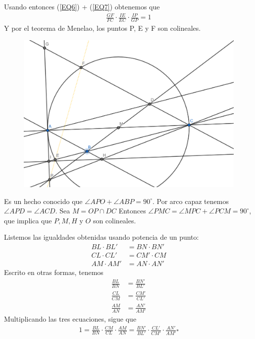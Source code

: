 \begin{sol}
	Usando entonces (\ref{EQ6}) + (\ref{EQ7}) obtenemos que
	\begin{align}
	\frac{GF}{FC} \cdot \frac{IE}{EC} \cdot \frac{IP}{GP} = 1 
	\end{align}
	Y por el teorema de Menelao, los puntos P, E y F son colineales.
	\begin{figure}[h!] 
		\centering
		\includegraphics[scale=0.4]{Imgs/JT2.png}
	\end{figure}
\end{sol}

\begin{sol}
	Es un hecho conocido que $\angle{APO} + \angle{ABP} = 90^{\circ}$. Por arco capaz tenemos $\angle{APD} = \angle{ACD}$. Sea $M = OP \cap DC$ Entonces $\angle{PMC} = \angle{MPC} + \angle{PCM} = 90^{\circ}$, que implica que $P, M, H$ y $O$ son colineales. 
\end{sol}

\begin{sol}
	Listemos las igualdades obtenidas usando potencia de un punto:
	\begin{align}
	BL \cdot BL' &= BN \cdot BN' \\
	CL \cdot CL' &= CM' \cdot CM \\
	AM \cdot AM' & = AN \cdot AN' 
	\end{align}
	Escrito en otras formas, tenemos 
	\begin{align}
	\frac{BL}{BN}&= \frac{BN'}{BL'} \\
	\frac{CL}{CM}&= \frac{CM'}{CL'} \\
	\frac{AM}{AN}&= \frac{AN'}{AM'} 
	\end{align}
	Multiplicando las tres ecuaciones, sigue que
	\begin{align}
	1 = \frac{BL}{BN}\cdot \frac{CM}{CL} \cdot \frac{AM}{AN} = \frac{BN'}{BL'} \cdot \frac{CL'}{CM'} \cdot  \frac{AN'}{AM'}  \square
	\end{align}
\end{sol}


